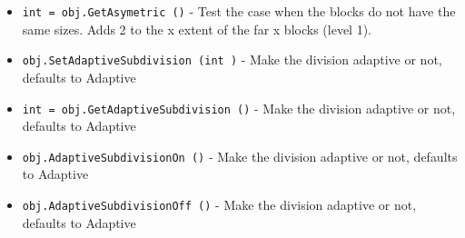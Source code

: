 \begin{itemize}
\item  \verb|int = obj.GetAsymetric ()| -  Test the case when the blocks do not have the same sizes.
 Adds 2 to the x extent of the far x blocks (level 1).

\item  \verb|obj.SetAdaptiveSubdivision (int )| -  Make the division adaptive or not, defaults to Adaptive

\item  \verb|int = obj.GetAdaptiveSubdivision ()| -  Make the division adaptive or not, defaults to Adaptive

\item  \verb|obj.AdaptiveSubdivisionOn ()| -  Make the division adaptive or not, defaults to Adaptive

\item  \verb|obj.AdaptiveSubdivisionOff ()| -  Make the division adaptive or not, defaults to Adaptive

\end{itemize}
